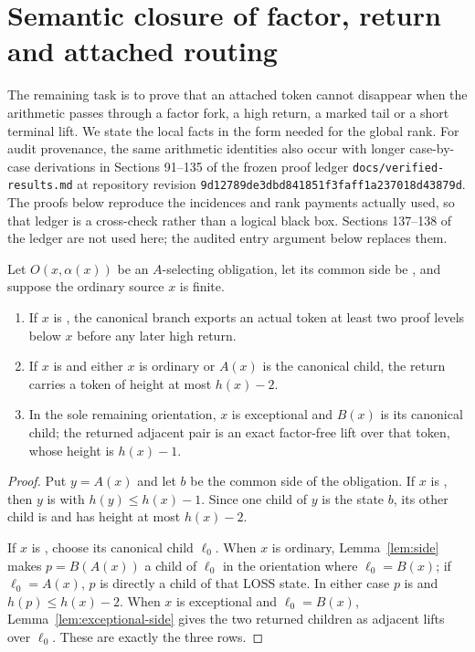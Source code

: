 \section{Semantic closure of factor, return and attached routing}
\label{sec:P2closed}

The remaining task is to prove that an attached token cannot disappear when
the arithmetic passes through a factor fork, a high return, a marked tail or
a short terminal lift.  We state the local facts in the form needed for the
global rank.  For audit provenance, the same arithmetic identities also occur with longer
case-by-case derivations in Sections 91--135 of the frozen proof ledger
\texttt{docs/verified-results.md} at repository revision
\nolinkurl{9d12789de3dbd841851f3faff1a237018d43879d}.  The proofs below reproduce
the incidences and rank payments actually used, so that ledger is a
cross-check rather than a logical black box.  Sections 137--138 of the ledger
are not used here; the audited entry argument below replaces them.

\begin{lemma}\label{lem:finite-export}
Let $O(x,\alpha(x))$ be an $A$-selecting obligation, let its common side be
\WIN, and suppose the ordinary source $x$ is finite.
\begin{enumerate}[label=(\alph*)]
\item If $x$ is \LOSS, the canonical branch exports an actual \LOSS token
      at least two proof levels below $x$ before any later high return.
\item If $x$ is \WIN and either $x$ is ordinary or $A(x)$ is the
      canonical \LOSS child, the return carries a \WIN token of height at
      most $h(x)-2$.
\item In the sole remaining orientation, $x$ is exceptional and $B(x)$ is
      its canonical \LOSS child; the returned adjacent pair is an exact
      factor-free lift over that token, whose height is $h(x)-1$.
\end{enumerate}
\end{lemma}

\begin{proof}
Put $y=A(x)$ and let $b$ be the common \WIN side of the obligation.  If
$x$ is \LOSS, then $y$ is \WIN with $h(y)\le h(x)-1$.  Since one child of
$y$ is the \WIN state $b$, its other child is \LOSS and has height at most
$h(x)-2$.

If $x$ is \WIN, choose its canonical \LOSS child $\ell_0$.  When $x$ is
ordinary, Lemma~\ref{lem:side} makes $p=B(A(x))$ a child of $\ell_0$ in the
orientation where $\ell_0=B(x)$; if $\ell_0=A(x)$, $p$ is directly a child
of that LOSS state.  In either case $p$ is \WIN and
$h(p)\le h(x)-2$.  When $x$ is exceptional and
$\ell_0=B(x)$, Lemma~\ref{lem:exceptional-side} gives the two returned
children as adjacent lifts over $\ell_0$.  These are exactly the three rows.
\end{proof}

